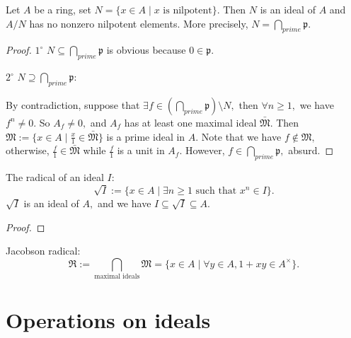 \begin{prop}
Let $A$ be a ring, set $N = \{x\in A\mid x \text{ is nilpotent} \}.$
Then $N$ is an ideal of $A$ and $A/N$ has no nonzero nilpotent
elements. More precisely, $N = \bigcap\limits_{prime}\mathfrak{p}.$
\end{prop}
\begin{proof}
$\mathit{1^{\circ}}$ $N\subseteq \bigcap\limits_{prime}\mathfrak{p}$
is obvious because $0\in \mathfrak{p}.$

$\mathit{2^{\circ}}$ $N\supseteq
\bigcap\limits_{prime}\mathfrak{p}:$

By contradiction, suppose that $\exists f\in
(\bigcap\limits_{prime}\mathfrak{p})\setminus N,$ then $\forall
n\geqslant 1,$ we have $f^n\neq 0.$ So $A_f\neq 0,$ and $A_f$ has at
least one maximal ideal $\bar{\mathfrak{M}}.$ Then $\mathfrak{M}:=
\{x\in A\mid \frac{x}{1}\in \bar{\mathfrak{M}}\}$ is a prime ideal
in $A.$ Note that we have $f\not\in \mathfrak{M},$ otherwise,
$\frac{f}{1}\in \bar{\mathfrak{M}}$ while $\frac{f}{1}$ is a unit in
$A_f.$ However, $f\in \bigcap\limits_{prime}\mathfrak{p},$ absurd.
\end{proof}
The radical of an ideal $I$:
$$\sqrt{I}:=\{x\in A\mid \exists n\geqslant 1\text{ such that }x^n\in I\}.$$
$\sqrt{I}$ is an ideal of $A,$ and we have
$I\subseteq\sqrt{I}\subseteq A.$
\begin{proof}

\end{proof}
Jacobson radical:
$$\mathfrak{R}:=\bigcap\limits_{\text{maximal ideals}}\mathfrak{M}=
\{x\in A\mid\forall y\in A,1+xy\in A^{\times}\}.$$

\newpage

\section{Operations on ideals}

